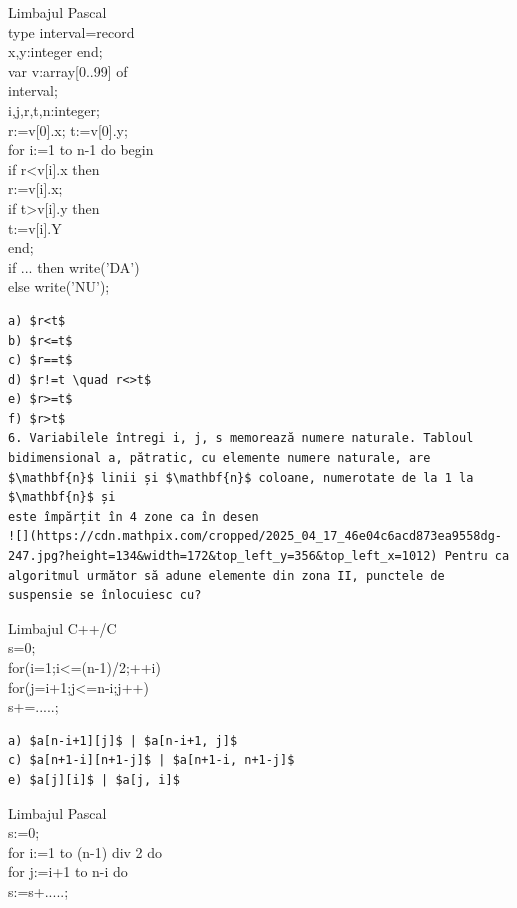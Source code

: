 \documentclass[10pt]{article}
\begin{document}
\begin{verbatim}

\end{verbatim}

Limbajul Pascal\\
type interval=record\\
x,y:integer end;\\[0pt]
var v:array[0..99] of\\
interval;\\
i,j,r,t,n:integer;\\[0pt]
r:=v[0].x; t:=v[0].y;\\
for i:=1 to n-1 do begin\\[0pt]
if r<v[i].x then\\[0pt]
r:=v[i].x;\\[0pt]
if t>v[i].y then\\[0pt]
t:=v[i].Y\\
end;\\
if ... then write('DA')\\
else write('NU');

\begin{verbatim}
a) $r<t$
b) $r<=t$
c) $r==t$
d) $r!=t \quad r<>t$
e) $r>=t$
f) $r>t$
6. Variabilele întregi i, j, s memorează numere naturale. Tabloul bidimensional a, pătratic, cu elemente numere naturale, are $\mathbf{n}$ linii și $\mathbf{n}$ coloane, numerotate de la 1 la $\mathbf{n}$ și
este împărțit în 4 zone ca în desen
![](https://cdn.mathpix.com/cropped/2025_04_17_46e04c6acd873ea9558dg-247.jpg?height=134&width=172&top_left_y=356&top_left_x=1012) Pentru ca algoritmul următor să adune elemente din zona II, punctele de suspensie se înlocuiesc cu?
\end{verbatim}

Limbajul C++/C\\
s=0;\\
for(i=1;i<=(n-1)/2;++i)\\
for(j=i+1;j<=n-i;j++)\\
s+=.....;

\begin{verbatim}
a) $a[n-i+1][j]$ | $a[n-i+1, j]$
c) $a[n+1-i][n+1-j]$ | $a[n+1-i, n+1-j]$
e) $a[j][i]$ | $a[j, i]$
\end{verbatim}

Limbajul Pascal\\
s:=0;\\
for i:=1 to (n-1) div 2 do\\
for j:=i+1 to n-i do\\
s:=s+.....;
\end{document}
